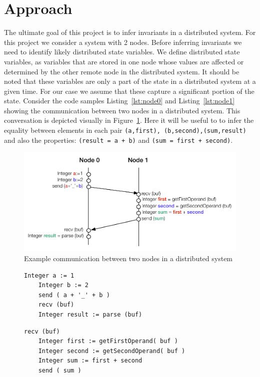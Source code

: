 \section{Approach}

The ultimate goal of this project is to infer invariants in a
distributed system. For this project we consider a
system with 2 nodes. Before inferring invariants we need to identify
likely distributed state variables. We define distributed state
variables, as variables that are stored in one node whose values are
affected or determined by the other remote node in the distributed
system. It should be noted that these variables are only a part of the
state in a distributed system at a given time. For our case we assume
that these capture a significant portion of the state. Consider the
code samples Listing~\ref{lst:node0} and Listing~\ref{lst:node1}
showing the communication between two nodes in a distributed system.
This conversation is depicted visually in
Figure~\ref{fig:sample_code_diag}. Here it will be useful to to infer
the equality between elements in each pair \texttt{(a,first),
(b,second),(sum,result)} and also the properties: \texttt{(result = a
+ b)} and \texttt{(sum = first + second)}.


\begin{figure}
  \includegraphics[width=\columnwidth]{sample_code.pdf}
  \caption{Example communication between two nodes in a distributed system}
  \label{fig:sample_code_diag}
\end{figure}

\begin{figure}
\begin{minipage}{.45\textwidth}
\begin{lstlisting}[caption={Sample code for Communication between 2 nodes - Node 0}, label=lst:node0]
    Integer a := 1
    Integer b := 2
    send ( a + '_' + b )
    recv (buf)
    Integer result := parse (buf)
\end{lstlisting}
\end{minipage}\hfill
\begin{minipage}{.45\textwidth}
\begin{lstlisting}[caption={Sample code for Communication between 2 nodes - Node 1}, label=lst:node1]
    recv (buf)
    Integer first := getFirstOperand( buf )
    Integer second := getSecondOperand( buf )
    Integer sum := first + second
    send ( sum )
\end{lstlisting}
\end{minipage}\hfill
\end{figure}

